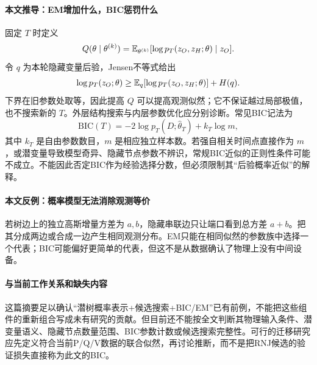 \paragraph{本文推导：EM增加什么，BIC惩罚什么}
固定 $T$ 时定义
\begin{equation}
 Q(\theta\mid\theta^{(k)})=
 \mathbb{E}_{\theta^{(k)}}[\log p_T(z_O,z_H;\theta)\mid z_O].
\end{equation}
令 $q$ 为本轮隐藏变量后验，Jensen不等式给出
\begin{equation}
 \log p_T(z_O;\theta)\geq
 \mathbb{E}_q[\log p_T(z_O,z_H;\theta)]+H(q).
\end{equation}
下界在旧参数处取等，因此提高 $Q$ 可以提高观测似然；它不保证越过局部极值，也不搜索新的 $T$。外层结构搜索与内层参数优化应分别诊断。常见BIC记法为
\begin{equation}
 \mathrm{BIC}(T)=-2\log p_T(D;\widehat\theta_T)+k_T\log m,
\end{equation}
其中 $k_T$ 是自由参数数目，$m$ 是相应独立样本数。若强自相关时间点直接作为 $m$，或潜变量导致模型奇异、隐藏节点参数不辨识，常规BIC近似的正则性条件可能不成立。不能因此否定BIC作为经验选择分数，但必须限制其“后验概率近似”的解释。

\paragraph{本文反例：概率模型无法消除观测等价}
若树边上的独立高斯增量方差为 $a,b$，隐藏串联边只让端口看到总方差 $a+b$。把其分成两边或合成一边产生相同观测分布。EM只能在相同似然的参数族中选择一个代表；BIC可能偏好更简单的代表，但这不是从数据确认了物理上没有中间设备。

\paragraph{与当前工作关系和缺失内容}
这篇摘要足以确认“潜树概率表示+候选搜索+BIC/EM”已有前例，不能把这些组件的重新组合写成未有研究的贡献。但目前还不能按全文判断其物理输入条件、潜变量语义、隐藏节点数量范围、BIC参数计数或候选搜索完整性。可行的迁移研究应先定义符合当前P/Q/V数据的联合似然，再讨论推断，而不是把RNJ候选的验证损失直接称为此文的BIC。


